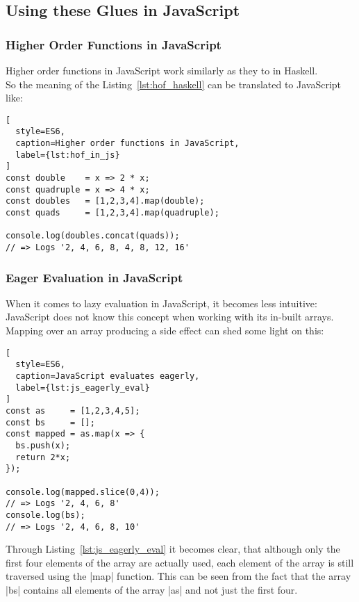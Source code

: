 \subsection{Using these Glues in JavaScript} %
\label{sub:Using these Glues in JavaScript}

\subsubsection{Higher Order Functions in JavaScript} %
\label{subsub:Higher Order Functions in JavaScript}
Higher order functions in JavaScript work similarly as they to in Haskell. \\
So the meaning of the Listing~\ref{lst:hof_haskell} can be translated to 
JavaScript like:

\begin{lstlisting}[
  style=ES6,
  caption=Higher order functions in JavaScript,
  label={lst:hof_in_js}
]
const double    = x => 2 * x;
const quadruple = x => 4 * x;
const doubles   = [1,2,3,4].map(double);
const quads     = [1,2,3,4].map(quadruple);

console.log(doubles.concat(quads));
// => Logs '2, 4, 6, 8, 4, 8, 12, 16'
\end{lstlisting}

\subsubsection{Eager Evaluation in JavaScript} %
\label{subsub:Eager Evaluation in JavaScript}

When it comes to lazy evaluation in JavaScript, it becomes less intuitive:
JavaScript does not know this concept when working with its in-built arrays.
Mapping over an array producing a side effect can shed some light on this:

\begin{lstlisting}[
  style=ES6,
  caption=JavaScript evaluates eagerly,
  label={lst:js_eagerly_eval}
]
const as     = [1,2,3,4,5];
const bs     = [];
const mapped = as.map(x => {
  bs.push(x);
  return 2*x;
});

console.log(mapped.slice(0,4));
// => Logs '2, 4, 6, 8'
console.log(bs);
// => Logs '2, 4, 6, 8, 10'
\end{lstlisting}

Through Listing~\ref{lst:js_eagerly_eval} it becomes clear, that although only
the first four elements of the array are actually used, each element of the
array is still traversed using the |map| function. This can be seen from the
fact that the array |bs| contains all elements of the array |as| and not just
the first four.

